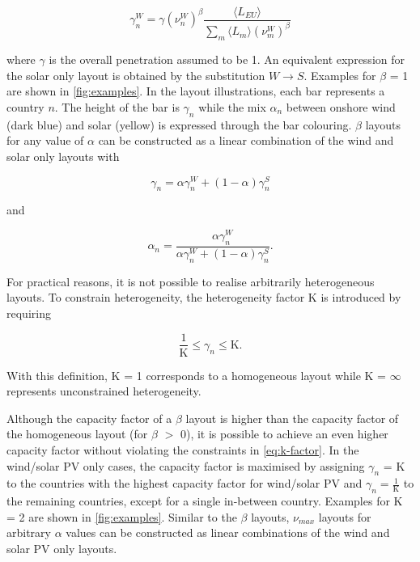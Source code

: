 \documentclass[a4paper, 5p, sort&compress]{elsarticle}%
\newcommand{\paren}[1]{\left(#1\right)}
\begin{document}
\begin{equation}
  \label{eq:8}
  \gamma_{n}^{W} = \gamma \paren{\nu^{W}_{n}}^{\beta} \frac{\langle L_{EU}
    \rangle}{\sum_{m} \langle L_{m}
    \rangle \paren{\nu^{W}_{m}}^{\beta}}
\end{equation}

where $\gamma$ is the overall penetration assumed to be 1. An equivalent
expression for the solar only layout is obtained by the substitution
$W \to S$. Examples for $\beta$ = 1 are shown in \cref{fig:examples}. In
the layout illustrations, each bar represents a country $n$. The
height of the bar is $\gamma_{n}$ while the mix $\alpha_{n}$ between onshore
wind (dark blue) and solar (yellow) is expressed through the bar
colouring. $\beta$ layouts for any value of $\alpha$ can be constructed as a
linear combination of the wind and solar only layouts with


\begin{equation}
  \label{eq:9}
  \gamma_{n} = \alpha \gamma^{W}_{n} + (1-\alpha) \gamma^{S}_{n} 
\end{equation}

and

\begin{equation}
  \label{eq:9}
  \alpha_{n} = \frac{\alpha \gamma_{n}^{W}}{\alpha \gamma_{n}^{W} + (1-\alpha) \gamma_{n}^{S}} .
\end{equation}


For practical reasons, it is not possible to realise arbitrarily
heterogeneous layouts. To constrain heterogeneity, the heterogeneity
factor K is introduced by requiring

\begin{equation}
  \label{eq:k-factor}
  \frac{1}{\text{K}} \leq \gamma_{n} \leq \text{K} .
\end{equation}

With this definition, K = 1 corresponds to a homogeneous layout while
K = $\infty$ represents unconstrained heterogeneity.

Although the capacity factor of a $\beta$ layout is higher than the
capacity factor of the homogeneous layout (for $\beta$ $>$ 0), it is
possible to achieve an even higher capacity factor without violating
the constraints in \cref{eq:k-factor}. In the wind/solar PV only
cases, the capacity factor is maximised by assigning $\gamma_{n}$ = K to
the countries with the highest capacity factor for wind/solar PV and
$\gamma_{n} = \frac{1}{\text{K}}$ to the remaining countries, except for a
single in-between country. Examples for K = 2 are shown in
\cref{fig:examples}. Similar to the $\beta$ layouts, $\nu_{max}$ layouts for
arbitrary $\alpha$ values can be constructed as linear combinations of the
wind and solar PV only layouts.
\end{document}
